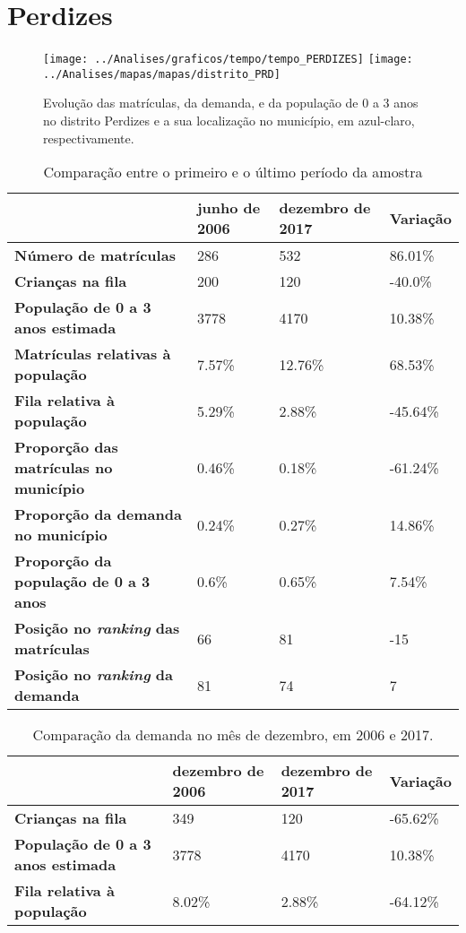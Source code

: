 \section{Perdizes}
\begin{figure}[H]
\centering
\texttt{[image: ../Analises/graficos/tempo/tempo\_PERDIZES]}
\texttt{[image: ../Analises/mapas/mapas/distrito\_PRD]}
\caption{Evolução das matrículas, da demanda, e da população de 0 a 3 anos no distrito Perdizes e a sua localização no município, em azul-claro, respectivamente.}
\end{figure}
\begin{table}[H]
\begin{tabular}{l|l|l|l}
\textbf{}                                      & \textbf{junho de 2006}       & \textbf{dezembro de 2017}    & \textbf{Variação} \\ \hline
\textbf{Número de matrículas}                  & 286 & 532 & 86.01\% \\ \hline
\textbf{Crianças na fila}                      & 200 & 120 & -40.0\% \\ \hline
\textbf{População de 0 a 3 anos estimada}      & 3778 & 4170 & 10.38\% \\ \hline
\textbf{Matrículas relativas à população}      & 7.57\% & 12.76\% & 68.53\% \\ \hline
\textbf{Fila relativa à população}             & 5.29\% & 2.88\% & -45.64\% \\ \hline
\textbf{Proporção das matrículas no município} & 0.46\% & 0.18\% & -61.24\% \\ \hline
\textbf{Proporção da demanda no município}     & 0.24\% & 0.27\% & 14.86\% \\ \hline
\textbf{Proporção da população de 0 a 3 anos}  & 0.6\% & 0.65\% & 7.54\% \\ \hline
\textbf{Posição no \textit{ranking} das matrículas}     & 66 & 81 & -15 \\ \hline
\textbf{Posição no \textit{ranking} da demanda}         & 81 & 74 & 7 \\ 
\end{tabular}
\caption{Comparação entre o primeiro e o último período da amostra}
\end{table}
\begin{table}[H]
\begin{tabular}{l|l|l|l}
\textbf{}                                 & \textbf{dezembro de 2006} & \textbf{dezembro de 2017} & \textbf{Variação} \\ \hline
\textbf{Crianças na fila}                      & 349 & 120 & -65.62\% \\ \hline
\textbf{População de 0 a 3 anos estimada}      & 3778 & 4170 & 10.38\% \\ \hline
\textbf{Fila relativa à população}             & 8.02\% & 2.88\% & -64.12\% \\
\end{tabular}
\caption{Comparação da demanda no mês de dezembro, em 2006 e 2017.}
\end{table}

